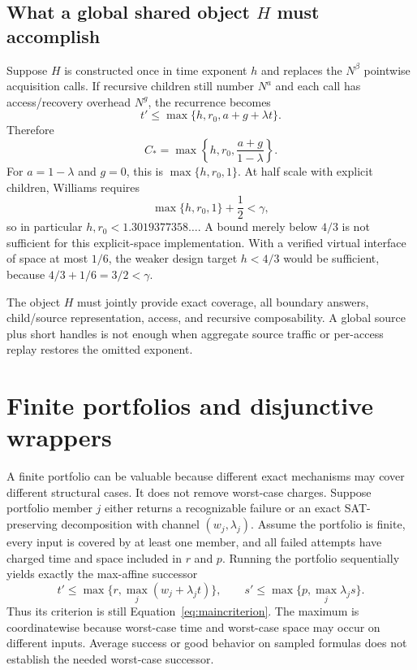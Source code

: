 \documentclass[11pt]{article}
\begin{document}
\subsection{What a global shared object \texorpdfstring{$H$}{H} must accomplish}

Suppose $H$ is constructed once in time exponent $h$ and replaces the
$N^\beta$ pointwise acquisition calls.  If recursive children still number
$N^a$ and each call has access/recovery overhead $N^g$, the recurrence becomes
\[
 t'\leq\max\{h,r_0,a+g+\lambda t\}.
\]
Therefore
\begin{equation}
 C_* = \max\left\{h,r_0,\frac{a+g}{1-\lambda}\right\}.\label{eq:batchfixed}
\end{equation}
For $a=1-\lambda$ and $g=0$, this is $\max\{h,r_0,1\}$.  At half scale with
explicit children, Williams requires
\[
 \max\{h,r_0,1\}+\frac12<\gamma,
\]
so in particular $h,r_0<1.3019377358\ldots$.  A bound merely below $4/3$ is
not sufficient for this explicit-space implementation.  With a verified
virtual interface of space at most $1/6$, the weaker design target $h<4/3$
would be sufficient, because $4/3+1/6=3/2<\gamma$.

The object $H$ must jointly provide exact coverage, all boundary answers,
child/source representation, access, and recursive composability.  A global
source plus short handles is not enough when aggregate source traffic or
per-access replay restores the omitted exponent.

\section{Finite portfolios and disjunctive wrappers}

A finite portfolio can be valuable because different exact mechanisms may
cover different structural cases.  It does not remove worst-case charges.
Suppose portfolio member $j$ either returns a recognizable failure or an exact
SAT-preserving decomposition with channel $(w_j,\lambda_j)$.  Assume the
portfolio is finite, every input is covered by at least one member, and all
failed attempts have charged time and space included in $r$ and $p$.  Running
the portfolio sequentially yields exactly the max-affine successor
\[
 t'\leq\max\{r,\max_j(w_j+\lambda_jt)\},\qquad
 s'\leq\max\{p,\max_j\lambda_js\}.
\]
Thus its criterion is still Equation~\eqref{eq:maincriterion}.  The maximum is
coordinatewise because worst-case time and worst-case space may occur on
different inputs.  Average success or good behavior on sampled formulas does
not establish the needed worst-case successor.
\end{document}
